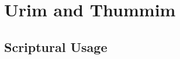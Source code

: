 \section{Urim and Thummim}
	\label{URIMTHUMMIM}
	




	


\subsection{Scriptural Usage} %
	\label{URIMTHUMMIM-SCRIPTURES}

